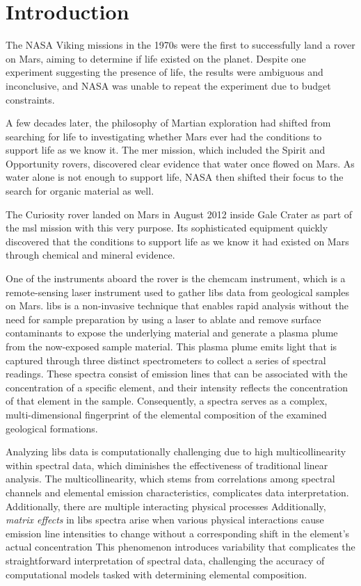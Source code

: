 \section{Introduction}\label{sec:introduction}
The NASA Viking missions in the 1970s were the first to successfully land a rover on Mars, aiming to determine if life existed on the planet.
Despite one experiment suggesting the presence of life, the results were ambiguous and inconclusive, and NASA was unable to repeat the experiment due to budget constraints\cite{marsnasagov_vikings}.

A few decades later, the philosophy of Martian exploration had shifted from searching for life to investigating whether Mars ever had the conditions to support life as we know it.
The \gls{mer} mission, which included the Spirit and Opportunity rovers, discovered clear evidence that water once flowed on Mars.
As water alone is not enough to support life, NASA then shifted their focus to the search for organic material as well\cite{marsnasagov_observer, marsnasagov_spirit_opportunity}.

The Curiosity rover landed on Mars in August 2012 inside Gale Crater as part of the \gls{msl} mission with this very purpose.
Its sophisticated equipment quickly discovered that the conditions to support life as we know it had existed on Mars through chemical and mineral evidence.\cite{marsnasagov_chemcam}

One of the instruments aboard the rover is the \gls{chemcam} instrument, which is a remote-sensing laser instrument used to gather \gls{libs} data from geological samples on Mars.
\gls{libs} is a non-invasive technique that enables rapid analysis without the need for sample preparation by using a laser to ablate and remove surface contaminants to expose the underlying material and generate a plasma plume from the now-exposed sample material.
This plasma plume emits light that is captured through three distinct spectrometers to collect a series of spectral readings.
These spectra consist of emission lines that can be associated with the concentration of a specific element, and their intensity reflects the concentration of that element in the sample.
Consequently, a spectra serves as a complex, multi-dimensional fingerprint of the elemental composition of the examined geological formations.\cite{cleggRecalibrationMarsScience2017}

Analyzing \gls{libs} data is computationally challenging due to high multicollinearity within spectral data, which diminishes the effectiveness of traditional linear analysis.
The multicollinearity, which stems from correlations among spectral channels and elemental emission characteristics, complicates data interpretation.
Additionally, there are multiple interacting physical processes
Additionally, \textit{matrix effects} in \gls{libs} spectra arise when various physical interactions cause emission line intensities to change without a corresponding shift in the element's actual concentration
This phenomenon introduces variability that complicates the straightforward interpretation of spectral data, challenging the accuracy of computational models tasked with determining elemental composition.\cite{andersonImprovedAccuracyQuantitative2017}

